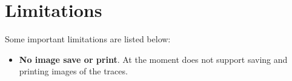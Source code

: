 
\section{Limitations}

Some important \hpctraceviewer{} limitations are listed below:
\begin{itemize}

\item \textbf{No image save or print}.
	At the moment \hpctraceviewer{} does not support saving and printing images of the traces.


\end{itemize}
